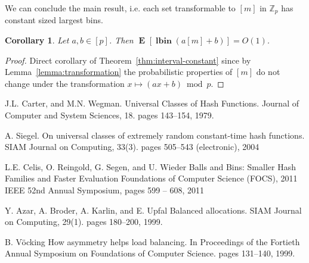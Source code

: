 \documentclass{article}
\newcommand{\vlbin}[1]{\operatorname{\mathbf{lbin}}({#1})}
\newcommand{\expects}[2]{\operatorname{\mathbf{E}}_{{#1}}\left[{#2}\right]}
\newcommand{\expect}[1]{\expects{}{#1}}
\newtheorem{corollary}{Corollary}
\begin{document}
We can conclude the main result, i.e. each set transformable to $[m]$ in $\mathbb{Z}_p$ has constant sized largest bins.
\begin{corollary}
Let $a, b \in [p]$. 
Then $\expect{\vlbin{a[m] + b}} = O(1)$.
\end{corollary}
\begin{proof}
Direct corollary of Theorem~\ref{thm:interval-constant} since by Lemma~\ref{lemma:transformation} the probabilistic properties of $[m]$ do not change under the transformation $x \mapsto (ax + b) \bmod p$.
\end{proof}


\begin{thebibliography}{32}
J.L. Carter, and M.N. Wegman. 
\newblock Universal Classes of Hash Functions.
\newblock Journal of Computer and System Sciences, 18. pages 143--154, 1979.

A. Siegel. 
\newblock On universal classes of extremely random constant-time hash functions.
\newblock SIAM Journal on Computing, 33(3). pages 505--543 (electronic), 2004

L.E. Celis, O. Reingold, G. Segen, and U. Wieder
\newblock Balls and Bins: Smaller Hash Families and Faster Evaluation
\newblock Foundations of Computer Science (FOCS), 2011 IEEE 52nd Annual Symposium, pages 599 -- 608, 2011

Y. Azar, A. Broder, A. Karlin, and E. Upfal
\newblock Balanced allocations.
\newblock SIAM Journal on Computing, 29(1). pages 180--200, 1999.

B. V\"{o}cking
\newblock How asymmetry helps load balancing.
\newblock In Proceedings of the Fortieth Annual Symposium on Foundations of Computer Science. pages 131--140, 1999.
\end{thebibliography}
\end{document}
